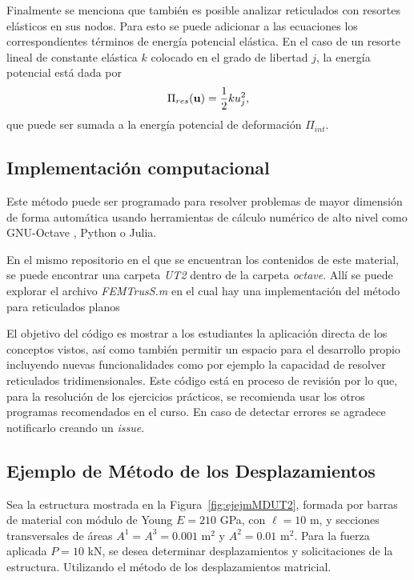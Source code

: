 Finalmente se menciona que también es posible analizar reticulados con resortes elásticos en sus nodos. Para esto se puede adicionar a las ecuaciones los correspondientes términos de energía potencial elástica. %
%
En el caso de un resorte lineal de constante elástica $k$ colocado en el grado de libertad $j$, la energía potencial está dada por
%
\begin{equation}
\Pi_{res}({\bf u}) = \frac{1}{2} k u_j^2,
\end{equation}
%
que puede ser sumada a la energía potencial de deformación $\Pi_{int}$.







\subsection{Implementación computacional}

Este método puede ser programado para resolver problemas de mayor dimensión de forma automática usando herramientas de cálculo numérico de alto nivel como GNU-Octave \citep{Eaton2015}, Python o Julia.  %

En el mismo repositorio en el que se encuentran los contenidos de este material, se puede encontrar una carpeta \textit{UT2} dentro de la carpeta \textit{octave}. Allí se puede explorar el archivo \textit{FEMTrusS.m} en el cual hay una implementación del método para reticulados planos


El objetivo del código es mostrar a los estudiantes la aplicación directa de los conceptos vistos, así como también permitir un espacio para el desarrollo propio incluyendo nuevas funcionalidades como por ejemplo la capacidad de resolver reticulados tridimensionales. %
%
Este código está en proceso de revisión por lo que, para la resolución de los ejercicios prácticos, se recomienda usar los otros programas recomendados en el curso. %
%
En caso de detectar errores se agradece notificarlo creando un \textit{issue}.




\subsection{Ejemplo de Método de los Desplazamientos} \label{sec:ejemplobarra}

Sea la estructura mostrada en la Figura~\ref{fig:ejejmMDUT2}, formada por barras de material con módulo de Young $E=210 $ GPa, con $\ell= 10$ m, y secciones transversales  de áreas $A^1 = A^3 = 0.001$ m$^2$ y $A^2 = 0.01 $ m$^2$. %
%
Para la fuerza aplicada $P= 10 $ kN, se desea determinar desplazamientos y solicitaciones de la estructura. Utilizando el método de los desplazamientos matricial.

